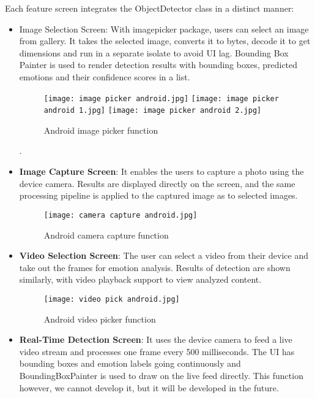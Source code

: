 \documentclass[a4paper,13pt]{report}
\begin{document}
Each feature screen integrates the ObjectDetector class in a distinct manner:
\begin{itemize}
  \item {Image Selection Screen}: With image\textunderscore picker package, users can select an image from gallery. It takes the selected image, converts it to bytes, decode it to get dimensions and run in a separate isolate to avoid UI lag. Bounding Box Painter is used to render detection results with bounding boxes, predicted emotions and their confidence scores in a list.

  \begin{figure}[H]
  \centering
  \texttt{[image: image picker android.jpg]}
  \texttt{[image: image picker android 1.jpg]}
  \texttt{[image: image picker android 2.jpg]}
  \caption{Android image picker function}
  \label{fig:method}
\end{figure}

.
  \item \textbf{Image Capture Screen}: It enables the users to capture a photo using the device camera. Results are displayed directly on the screen, and the same processing pipeline is applied to the captured image as to selected images.

  \begin{figure}[H]
  \centering
  \texttt{[image: camera capture android.jpg]}
  \caption{Android camera capture function}
  \label{fig:method}
\end{figure}
  
  \item \textbf{Video Selection Screen}: The user can select a video from their device and take out the frames for emotion analysis. Results of detection are shown similarly, with video playback support to view analyzed content.
  \begin{figure}[H]
  \centering
  \texttt{[image: video pick android.jpg]}
  \caption{Android video picker function}
  \label{fig:method}
\end{figure}

  \item \textbf{Real-Time Detection Screen}: It uses the device camera to feed a live video stream and processes one frame every 500 milliseconds. The UI has bounding boxes and emotion labels going continuously and BoundingBoxPainter is used to draw on the live feed directly. This function however, we cannot develop it, but it will be developed in the future.

\end{itemize}
\end{document}
